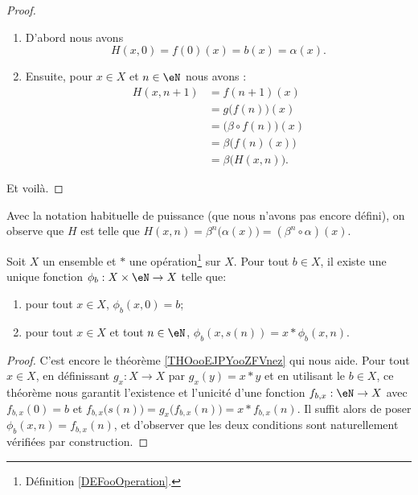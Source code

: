 \begin{proof}
	\begin{enumerate}
		\item
		      D'abord nous avons
		      \begin{equation}
			      H(x,0)=f(0) (x) =b(x)=\alpha(x).
		      \end{equation}
		\item
		      Ensuite, pour \( x\in X\) et \( n\in \eN\) nous avons :
		      \begin{subequations}
			      \begin{align}
				      H(x,n+1) & =f(n+1) (x)                      \\
				               & =g\big( f(n) \big) (x)           \\
				               & =\big( \beta\circ f(n) \big) (x) \\
				               & =\beta\big( f(n) (x) \big)       \\
				               & =\beta\big( H(x,n) \big).
			      \end{align}
		      \end{subequations}
	\end{enumerate}
	Et voilà.
\end{proof}

\begin{normaltext}	\label{NORMooPuissanceFonction}
	Avec la notation habituelle de puissance (que nous n'avons pas encore défini), on observe que \( H \) est telle que \( H(x,n) = \beta^n\big(\alpha(x)\big) = (\beta^n \circ \alpha) (x)\).
\end{normaltext}

\begin{corollary}	\label{CORooItereesOperation}
	Soit \( X \) un ensemble et \( * \) une opération\footnote{Définition \ref{DEFooOperation}.} sur \( X \). Pour tout \( b \in X \), il existe une unique fonction \( \phi_b : X \times \eN \to X \) telle que:
 	\begin{enumerate}
  		\item
			pour tout \( x \in X\), \( \phi_b(x, 0) = b \);
   		\item
	 		pour tout \( x \in X\) et tout \( n \in \eN\), \( \phi_b(x, s(n)) = x*\phi_b(x,n) \).
	\end{enumerate}
\end{corollary}

\begin{proof}
	C'est encore le théorème \ref{THOooEJPYooZFVnez} qui nous aide. Pour tout \( x \in X \), en définissant \( g_x : X \to X \) par \( g_x (y) = x*y \) et en utilisant le \( b \in X \), ce théorème nous garantit l'existence et l'unicité d'une fonction \( f_{b,x} : \eN \to X \) avec \( f_{b,x}(0) = b \) et \( f_{b,x}\big(s(n)\big) = g_x\big(f_{b,x}(n)\big) = x * f_{b,x}(n) \). Il suffit alors de poser \( \phi_b(x,n) = f_{b,x}(n) \), et d'observer que les deux conditions sont naturellement vérifiées par construction.
\end{proof}


